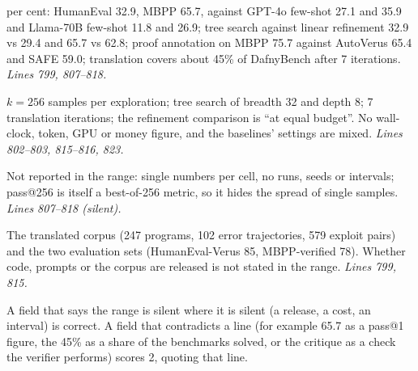 \documentclass[11pt]{article}
\begin{document}
\begin{description}
  per cent: HumanEval 32.9, MBPP 65.7, against GPT-4o few-shot 27.1 and 35.9
  and Llama-70B few-shot 11.8 and 26.9; tree search against linear refinement
  32.9 vs 29.4 and 65.7 vs 62.8; proof annotation on MBPP 75.7 against
  AutoVerus 65.4 and SAFE 59.0; translation covers about 45\% of DafnyBench
  after 7 iterations. \emph{Lines 799, 807--818.}
\item[Budget.] $k = 256$ samples per exploration; tree search of breadth 32
  and depth 8; 7 translation iterations; the refinement comparison is ``at
  equal budget''. No wall-clock, token, GPU or money figure, and the baselines'
  settings are mixed. \emph{Lines 802--803, 815--816, 823.}
\item[Variance.] Not reported in the range: single numbers per cell, no runs,
  seeds or intervals; pass@256 is itself a best-of-256 metric, so it hides the
  spread of single samples. \emph{Lines 807--818 (silent).}
\item[Artifact.] The translated corpus (247 programs, 102 error trajectories,
  579 exploit pairs) and the two evaluation sets (HumanEval-Verus 85,
  MBPP-verified 78). Whether code, prompts or the corpus are released is not
  stated in the range. \emph{Lines 799, 815.}
\end{description}
A field that says the range is silent where it is silent (a release, a cost,
an interval) is correct. A field that contradicts a line (for example 65.7 as
a pass@1 figure, the 45\% as a share of the benchmarks solved, or the critique
as a check the verifier performs) scores 2, quoting that line.
\end{document}
